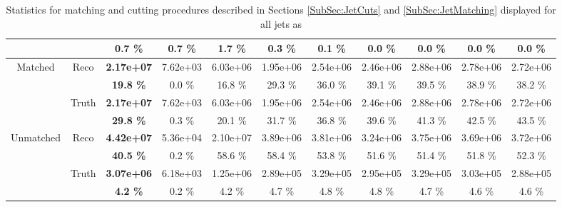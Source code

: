 \begin{appendices}
\begin{landscape}
\begin{table}
\begin{tabular}{|c|c|>{\bfseries}c|c|c|c|c|c|c|c|c|}
                                    &                           & 0.7 \%   & 0.7 \%   & 1.7 \%   & 0.3 \%   & 0.1 \%   & 0.0 \%   & 0.0 \%   & 0.0 \%   & 0.0 \%   \\
    \hline                                                                                      
    \hline                                                                                      
    \multirow{4}{*}{Matched}        & \multirow{2}{*}{Reco}   & 2.17e+07 & 7.62e+03 & 6.03e+06 & 1.95e+06 & 2.54e+06 & 2.46e+06 & 2.88e+06 & 2.78e+06 & 2.72e+06 \\
                                    &                           & 19.8 \%  & 0.0 \%   & 16.8 \%  & 29.3 \%  & 36.0 \%  & 39.1 \%  & 39.5 \%  & 38.9 \%  & 38.2 \%  \\
    \cline{2-11}                                                                                    
                                    & \multirow{2}{*}{Truth}    & 2.17e+07 & 7.62e+03 & 6.03e+06 & 1.95e+06 & 2.54e+06 & 2.46e+06 & 2.88e+06 & 2.78e+06 & 2.72e+06 \\
                                    &                           & 29.8 \%  & 0.3 \%   & 20.1 \%  & 31.7 \%  & 36.8 \%  & 39.6 \%  & 41.3 \%  & 42.5 \%  & 43.5 \%  \\
    \hline                                                                                      
    \hline                                                                                      
    \multirow{4}{*}{Unmatched}      & \multirow{2}{*}{Reco}   & 4.42e+07 & 5.36e+04 & 2.10e+07 & 3.89e+06 & 3.81e+06 & 3.24e+06 & 3.75e+06 & 3.69e+06 & 3.72e+06 \\
                                    &                           & 40.5 \%  & 0.2 \%   & 58.6 \%  & 58.4 \%  & 53.8 \%  & 51.6 \%  & 51.4 \%  & 51.8 \%  & 52.3 \%  \\
    \cline{2-11}                                                                                    
                                    & \multirow{2}{*}{Truth}    & 3.07e+06 & 6.18e+03 & 1.25e+06 & 2.89e+05 & 3.29e+05 & 2.95e+05 & 3.29e+05 & 3.03e+05 & 2.88e+05 \\
                                    &                           & 4.2 \%   & 0.2 \%   & 4.2 \%   & 4.7 \%   & 4.8 \%   & 4.8 \%   & 4.7 \%   & 4.6 \%   & 4.6 \%   \\
    \hline
  \end{tabular}
  \caption{Statistics for matching and cutting procedures described in Sections
    \ref{SubSec:JetCuts} and \ref{SubSec:JetMatching} displayed for all jets as
}
\end{table}
\end{landscape}
\end{appendices}
